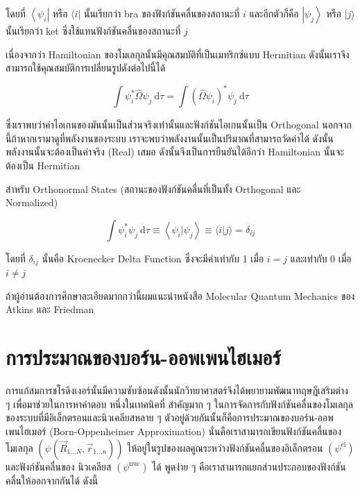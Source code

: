 \noindent โดยที่ $\left\langle\psi_i\right|$ หรือ $\langle i|$ นั้นเรียกว่า bra ของฟังก์ชันคลื่นของสถานะที่ $i$ และอีกตัวก็คือ
$\left|\psi_j\right\rangle$ หรือ $|j\rangle$ นั้นเรียกว่า ket ซึ่งใช้แทนฟังก์ชันคลื่นของสถานะที่ $j$

เนื่องจากว่า Hamiltonian ของโมเลกุลนั้นมีคุณสมบัติที่เป็นเมทริกซ์แบบ Hermitian ดังนั้นเราจึงสามารถใช้คุณสมบัติการเปลี่ยนรูปดังต่อไปนี้ได้

\begin{equation}
    \int \psi_i^* \hat{\Omega} \psi_j \mathrm{~d} \tau
    =
    \int\left(\hat{\Omega} \psi_i\right)^* \psi_j \mathrm{~d} \tau
\end{equation}

\noindent ซึ่งเราพบว่าค่าไอเกนของมันนั้นเป็นส่วนจริงเท่านั้นและฟังก์ชันไอเกนนั้นเป็น Orthogonal นอกจากนี้ถ้าหากเรามาดูที่พลังงานของระบบ%
เราจะพบว่าพลังงานนั้นเป็นปริมาณที่สามารถวัดค่าได้ ดังนั้นพลังงานนั้นจะต้องเป็นค่าจริง (Real) เสมอ ดังนั้นจึงเป็นการยืนยันได้อีกว่า Hamiltonian
นั้นจะต้องเป็น Hermitian

สำหรับ Orthonormal States (สถานะของฟังก์ชันคลื่นที่เป็นทั้ง Orthogonal และ Normalized)

\begin{equation}
    \int \psi_i^* \psi_j \mathrm{~d} \tau
    \equiv
    \left\langle\psi_i | \psi_j\right\rangle
    \equiv
    \langle i | j\rangle=\delta_{i j}
\end{equation}

\noindent โดยที่ $\delta_{i j}$ นั้นคือ Kroenecker Delta Function ซึ่งจะมีค่าเท่ากับ 1 เมื่อ $i=j$ และเท่ากับ 0 เมื่อ $i \neq j$

ถ้าผู้อ่านต้องการศึกษาละเอียดมากกว่านี้ผมแนะนำหนังสือ Molecular Quantum Mechanics ของ Atkins และ Friedman

\section{การประมาณของบอร์น-ออพเพนไฮเมอร์}

การแก้สมการชโรดิงเงอร์นั้นมีความซับซ้อนดังนั้นนักวิทยาศาสตร์จึงได้พยายามพัฒนาทฤษฎีเสริมต่าง ๆ เพื่อมาช่วยในการหาคำตอบ หนึ่งในเทคนิคที่%
สำคัญมาก ๆ ในการจัดการกับฟังก์ชันคลื่นของโมเลกุลของระบบที่มีอิเล็กตรอนและนิวเคลียสหลาย ๆ ตัวอยู่ด้วยกันนั้นก็คือการประมาณของบอร์น-ออพเพนไฮเมอร์
(Born-Oppenheimer Approximation) นั่นคือเราสามารถเขียนฟังก์ชันคลื่นของโมเลกุล $(\psi\left(\vec{R}_{1 \ldots N},
    \vec{r}_{1 \ldots n}\right))$ ให้อยู่ในรูปของผลคูณระหว่างฟังก์ชันคลื่นของอิเล็กตรอน $(\psi^{\mathrm{el}})$ และฟังก์ชันคลื่นของ%
นิวเคลียส $(\psi^{\text{nuc}})$ ได้ พูดง่าย ๆ คือเราสามารถแยกส่วนประกอบของฟังก์ชันคลื่นให้ออกจากกันได้ ดังนี้

